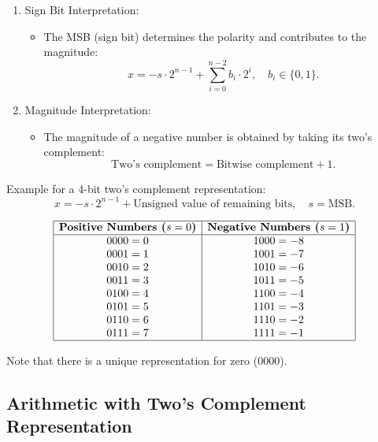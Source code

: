 \begin{enumerate}[left=1cm]
    \item Sign Bit Interpretation:
    \begin{itemize}
        \item The MSB (sign bit) determines the polarity and contributes to the magnitude:
        \[
        x = -s \cdot 2^{n-1} + \sum_{i=0}^{n-2} b_i \cdot 2^i, \quad b_i \in \{0, 1\}.
        \]
    \end{itemize}

    \item Magnitude Interpretation:
    \begin{itemize}
        \item The magnitude of a negative number is obtained by taking its two's complement:
        \[
        \text{Two's complement} = \text{Bitwise complement} + 1.
        \]
    \end{itemize}
\end{enumerate}

Example for a 4-bit two's complement representation:
\[
x = -s \cdot 2^{n-1} + \text{Unsigned value of remaining bits}, \quad s = \text{MSB}.
\]

\[
\begin{array}{|c|c|}
\hline
\textbf{Positive Numbers (\( s = 0 \))} & \textbf{Negative Numbers (\( s = 1 \))} \\
\hline
0000 = 0 & 1000 = -8 \\
0001 = 1 & 1001 = -7 \\
0010 = 2 & 1010 = -6 \\
0011 = 3 & 1011 = -5 \\
0100 = 4 & 1100 = -4 \\
0101 = 5 & 1101 = -3 \\
0110 = 6 & 1110 = -2 \\
0111 = 7 & 1111 = -1 \\
\hline
\end{array}
\]

Note that there is a unique representation for zero (\( 0000 \)).


\subsection{Arithmetic with Two's Complement Representation}
